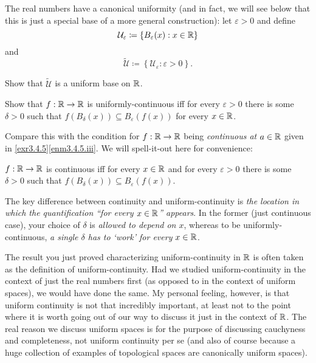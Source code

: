 \horizontalrule

\begin{exm}
The real numbers have a canonical uniformity (and in fact, we will see below that this is just a special base of a more general construction):  let $\varepsilon >0$ and define
\begin{equation}
\mathcal{U}_{\varepsilon}\coloneqq \left\{ B_{\varepsilon}(x):x\in \mathbb{R} \right\}
\end{equation}
 and
\begin{equation}
\widetilde{\mathcal{U}}\coloneqq \left\{ \mathcal{U}_{\varepsilon}:\varepsilon >0\right\} .
\end{equation}
\begin{exr}
Show that $\widetilde{\mathcal{U}}$ is a uniform base on $\mathbb{R}$.
\end{exr}
\begin{exr}
Show that $f:\mathbb{R} \rightarrow \mathbb{R}$ is uniformly-continuous iff for every $\varepsilon >0$ there is some $\delta >0$ such that $f(B_{\delta}(x))\subseteq B_{\varepsilon}(f(x))$ for every $x\in \mathbb{R}$.
\begin{rmk}
Compare this with the condition for $f:\mathbb{R} \rightarrow \mathbb{R}$ being \emph{continuous at $a\in \mathbb{R}$} given in \cref{exr3.4.5}\ref{enm3.4.5.iii}.  We will spell-it-out here for convenience:
\begin{textequation}
$f:\mathbb{R} \rightarrow \mathbb{R}$ is continuous iff for every $x\in \mathbb{R}$ and for every $\varepsilon >0$ there is some $\delta >0$ such that $f(B_{\delta}(x))\subseteq B_{\varepsilon}(f(x))$.
\end{textequation}
The key difference between continuity and uniform-continuity is \emph{the location in which the quantification ``for every $x\in \mathbb{R}$'' appears}.  In the former (just continuous case), your choice of $\delta$ is \emph{allowed to depend on $x$}, whereas to be uniformly-continuous, \emph{a single $\delta$ has to `work' for every $x\in \mathbb{R}$}.
\end{rmk}
\begin{rmk}
The result you just proved characterizing uniform-continuity in $\mathbb{R}$ is often taken as the definition of uniform-continuity.  Had we studied uniform-continuity in the context of just the real numbers first (as opposed to in the context of uniform spaces), we would have done the same.  My personal feeling, however, is that uniform continuity is not that incredibly important, at least not to the point where it is worth going out of our way to discuss it just in the context of $\mathbb{R}$.  The real reason we discuss uniform spaces is for the purpose of discussing cauchyness and completeness, not uniform continuity per se (and also of course because a huge collection of examples of topological spaces are canonically uniform spaces).
\end{rmk}
\end{exr}
\end{exm}
